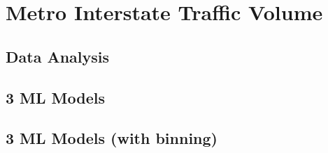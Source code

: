 \documentclass[12pt]{article}
\begin{document}
\section{Metro Interstate Traffic Volume}

\subsection{Data Analysis}

\subsection{3 ML Models}

\subsection{3 ML Models (with binning)}
\end{document}
